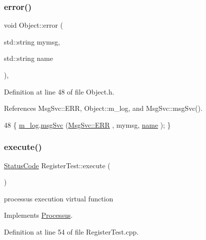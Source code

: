 \subsubsection{\texorpdfstring{error()}{error()}\hspace{0.1cm}{\footnotesize\ttfamily [2/2]}}
{\footnotesize\ttfamily void Object\+::error (\begin{DoxyParamCaption}\item[{std\+::string}]{mymsg,  }\item[{std\+::string}]{name }\end{DoxyParamCaption})\hspace{0.3cm}{\ttfamily [inline]}, {\ttfamily [inherited]}}



Definition at line 48 of file Object.\+h.



References Msg\+Svc\+::\+E\+RR, Object\+::m\+\_\+log, and Msg\+Svc\+::msg\+Svc().


\begin{DoxyCode}
48 \{ \hyperlink{classObject_a0d269813dd7ac1f24bc143031e2963f2}{m\_log}.\hyperlink{classMsgSvc_ad25f18047920cc59a314e5098259711c}{msgSvc} (\hyperlink{classMsgSvc_ae671eb7301996cd049d2da8a65925926a35a9d7166e9896af4ec8fb33bf5f1772}{MsgSvc::ERR}     , mymsg, \hyperlink{classObject_a300f4c05dd468c7bb8b3c968868443c1}{name} ); \}
\end{DoxyCode}
\mbox{\label{classRegisterTest_aa1a19b0cd0e0f2d8a47913521ae259a4}} 
\subsubsection{\texorpdfstring{execute()}{execute()}}
{\footnotesize\ttfamily \hyperlink{classStatusCode}{Status\+Code} Register\+Test\+::execute (\begin{DoxyParamCaption}{ }\end{DoxyParamCaption})\hspace{0.3cm}{\ttfamily [virtual]}}

processus execution virtual function 

Implements \hyperlink{classProcessus_a63767a63a1fb0055c5aa45b21a4a5d58}{Processus}.



Definition at line 54 of file Register\+Test.\+cpp.



